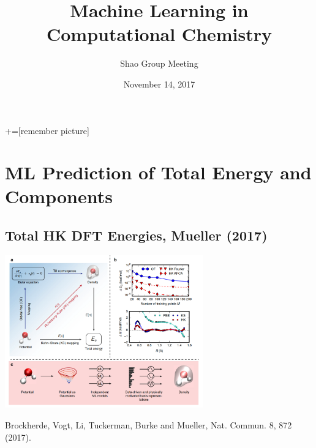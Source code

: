 \documentclass[handout]{beamer} %
\author[]{Shao Group Meeting}
\institute[]{University of Oklahoma }
\title[Machine Learning]{Machine Learning in Computational Chemistry}
\date[November 14, 2017]{November 14, 2017}
\begin{document}

+=[remember picture]

\everymath{\displaystyle}

\frame{\titlepage}

\section{ML Prediction of Total Energy and Components} 

\subsection{Total HK DFT Energies, Mueller (2017)}

\begin{frame}
\begin{center}
\includegraphics[height=2.6in]{figures_ml/Mueller_summary.png}
\end{center}
\vspace{1mm}
\begin{center}
\footnotesize{Brockherde, Vogt, Li, Tuckerman, Burke and Mueller, Nat. Commun. 8, 872 (2017).}
\end{center} 
\end{frame}
\end{document}
